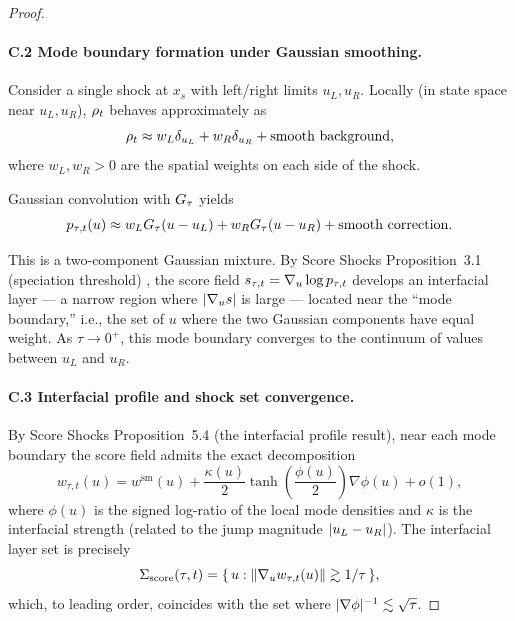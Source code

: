 \begin{proof}
\paragraph{C.2 Mode boundary formation under Gaussian smoothing.}
Consider a single shock at $x_{s}$ with left/right limits $u_{L}, u_{R}$. Locally (in state space near $u_{L}, u_{R}$), $\rho_{t}$ behaves approximately as
\begin{equation}
\rho_{t} \approx w_{L} \delta_{u_{L}} + w_{R} \delta_{u_{R}} + \text{smooth background},
\label{eq:thm1-C2-approx}
\end{equation}
where $w_{L}, w_{R} > 0$ are the spatial weights on each side of the shock.

Gaussian convolution with $G_{\tau}$ yields
\begin{equation}
p_{\tau, t}(u) \approx w_{L} G_{\tau}(u - u_{L}) + w_{R} G_{\tau}(u - u_{R}) + \text{smooth correction}.
\label{eq:thm1-C2-mixture}
\end{equation}

This is a two-component Gaussian mixture. By Score Shocks Proposition~3.1 (speciation threshold) \citep{sarkar2026scoreshocks}, the score field $s_{\tau, t} = \nabla_{u} \log p_{\tau, t}$ develops an interfacial layer --- a narrow region where $\lvert \nabla_{u} s \rvert$ is large --- located near the ``mode boundary,'' i.e., the set of $u$ where the two Gaussian components have equal weight. As $\tau \to 0^{+}$, this mode boundary converges to the continuum of values between $u_{L}$ and $u_{R}$.

\paragraph{C.3 Interfacial profile and shock set convergence.}
By Score Shocks Proposition~5.4 \citep{sarkar2026scoreshocks} (the interfacial profile result), near each mode boundary the score field admits the exact decomposition
\begin{equation}
w_{\tau, t}(u) = w^{\mathrm{sm}}(u) + \frac{\kappa(u)}{2} \tanh\!\left(\frac{\phi(u)}{2}\right) \nabla \phi(u) + o(1),
\label{eq:thm1-C3-decomp}
\end{equation}
where $\phi(u)$ is the signed log-ratio of the local mode densities and $\kappa$ is the interfacial strength (related to the jump magnitude $\lvert u_{L} - u_{R} \rvert$). The interfacial layer set is precisely
\begin{equation}
\Sigma_{\mathrm{score}}(\tau, t) = \{\, u : \lVert \nabla_{u} w_{\tau, t}(u) \rVert \gtrsim 1/\tau \,\},
\label{eq:thm1-C3-layer}
\end{equation}
which, to leading order, coincides with the set where $\lvert \nabla \phi \rvert^{-1} \lesssim \sqrt{\tau}$.


\end{proof}
